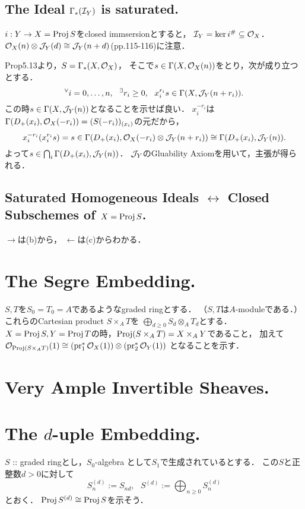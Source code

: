 \documentclass[a4paper]{jsarticle}
\begin{document}
    \subsection{The Ideal $\Gamma_*(\mathcal{I}_Y)$ is saturated.}
    $i: Y \to X=\operatorname{Proj} S$をclosed immsersionとすると，
    $\mathcal{I}_Y=\ker i^{\#} \subseteq \mathcal{O}_X$．
    $\mathcal{O}_X(n) \otimes \mathcal{J}_Y(d) \cong \mathcal{J}_Y(n+d)$(pp.115-116)に注意．

    Prop5.13より，$S=\Gamma_*(X,\mathcal{O}_X)$，
    そこで$s \in \Gamma(X,\mathcal{O}_X(n))$をとり，次が成り立つとする．
    \[ {}^{\forall} i=0,\dots,n,~~ {}^{\exists} r_i \geq 0,~~ x_i^{r_i}s \in \Gamma(X,\mathcal{J}_Y(n+r_i)). \]
    この時$s \in \Gamma(X,\mathcal{J}_Y(n))$となることを示せば良い．
    $x_i^{-r_i}$は$\Gamma(D_+(x_i),\mathcal{O}_X(-r_i))=(S(-r_i))_{(x_i)}$の元だから，
    \[  x_i^{-r_i}(x_i^{r_i}s)=s \in \Gamma(D_+(x_i),\mathcal{O}_X(-r_i) \otimes \mathcal{J}_Y(n+r_i)) \cong \Gamma(D_+(x_i),\mathcal{J}_Y(n)). \]
    よって$s \in \bigcap_i \Gamma(D_+(x_i),\mathcal{J}_Y(n))$．
    $\mathcal{J}_Y$のGluability Axiomを用いて，主張が得られる．

    \subsection{Saturated Homogeneous Ideals $\leftrightarrow$ Closed Subschemes of $X=\operatorname{Proj} S$.}
    $\rightarrow$は(b)から，
    $\leftarrow$は(c)からわかる．

\section{The Segre Embedding.} %
    $S,T$を$S_0=T_0=A$であるようなgraded ringとする．
    （$S,T$は$A$-moduleである．）
    これらのCartesian product $S \times_A T$を
    $\bigoplus_{d \geq 0} S_d \otimes_A T_d$とする．
    $X=\operatorname{Proj} S, Y=\operatorname{Proj} T$の時，$\operatorname{Proj} (S \times_A T)=X \times_A Y$であること，
    加えて$\mathcal{O}_{\operatorname{Proj} (S \times_A T)}(1) \cong (\operatorname{pr}_1^*\mathcal{O}_{X}(1)) \otimes (\operatorname{pr}_2^*\mathcal{O}_Y(1))$
    となることを示す．

\section{Very Ample Invertible Sheaves.} %

\section{The $d$-uple Embedding.} %
    $S$ :: graded ringとし，$S_0$-algebra として$S_1$で生成されているとする．
    この$S$と正整数$d>0$に対して
    \[ S_n^{(d)}:=S_{nd},~~~ S^{(d)}:=\bigoplus_{n \geq 0} S_n^{(d)} \]
    とおく．
    $\operatorname{Proj} S^{(d)} \cong \operatorname{Proj} S$を示そう．
\end{document}
